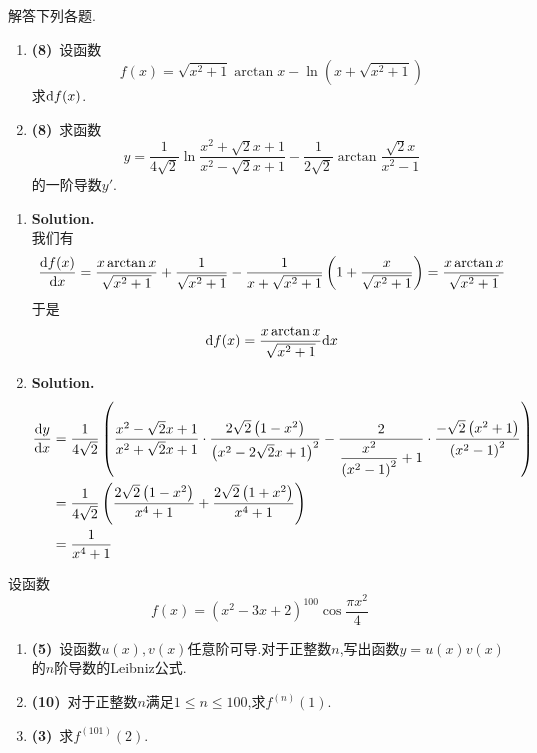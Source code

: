 \documentclass{ctexart}
\begin{document}
\begin{problem}
    解答下列各题.
    \begin{enumerate}[label=\textbf{(\arabic*)}]
        \item \textbf{(8)}\ 设函数$$f(x)=\sqrt{x^2+1}\arctan x-\ln\left(x+\sqrt{x^2+1}\right)$$求$\mathrm{d} f(x)$.
        \item \textbf{(8)}\ 求函数$$y=\dfrac{1}{4\sqrt{2}}\ln\dfrac{x^2+\sqrt{2}x+1}{x^2-\sqrt{2}x+1}-\dfrac{1}{2\sqrt{2}}\arctan\dfrac{\sqrt{2}x}{x^2-1}$$的一阶导数$y'$.
    \end{enumerate}
\end{problem}
\begin{solution}
    \begin{enumerate}[label=\textbf{(\arabic*)}]
        \item \textbf{Solution.}\\
            我们有$$\dfrac{\mathrm{d} f(x)}{\mathrm{d} x}=\dfrac{x\arctan x}{\sqrt{x^2+1}}+\dfrac{1}{\sqrt{x^2+1}}-\dfrac{1}{x+\sqrt{x^2+1}}\left(1+\dfrac{x}{\sqrt{x^2+1}}\right)=\dfrac{x\arctan x}{\sqrt{x^2+1}}$$
            于是$$\mathrm{d} f(x)=\dfrac{x\arctan x}{\sqrt{x^2+1}}\mathrm{d} x$$
        \item \textbf{Solution.}
            $$\begin{aligned}
                \dfrac{\mathrm{d} y}{\mathrm{d} x}
                &= \dfrac{1}{4\sqrt{2}}\left(\dfrac{x^2-\sqrt{2}x+1}{x^2+\sqrt{2}x+1}\cdot\dfrac{2\sqrt{2}\left(1-x^2\right)}{\left(x^2-2\sqrt{2}x+1\right)^2}-\dfrac{2}{\dfrac{x^2}{\left(x^2-1\right)^2}+1}\cdot\dfrac{-\sqrt{2}\left(x^2+1\right)}{\left(x^2-1\right)^2}\right) \\
                &= \dfrac{1}{4\sqrt{2}}\left(\dfrac{2\sqrt{2}\left(1-x^2\right)}{x^4+1}+\dfrac{2\sqrt{2}\left(1+x^2\right)}{x^4+1}\right) \\
                &= \dfrac{1}{x^4+1}
            \end{aligned}$$
    \end{enumerate}
\end{solution}
\begin{problem}
    设函数$$f(x)=\left(x^2-3x+2\right)^{100}\cos\dfrac{\pi x^2}{4}$$
    \begin{enumerate}[label=\textbf{(\arabic*)}]
        \item \textbf{(5)}\ 设函数$u(x),v(x)$任意阶可导.对于正整数$n$,写出函数$y=u(x)v(x)$的$n$阶导数的Leibniz公式.
        \item \textbf{(10)}\ 对于正整数$n$满足$1\leqslant n\leqslant100$,求$f^{(n)}(1)$.
        \item \textbf{(3)}\ 求$f^{(101)}(2)$.
    \end{enumerate}
\end{problem}
\end{document}
